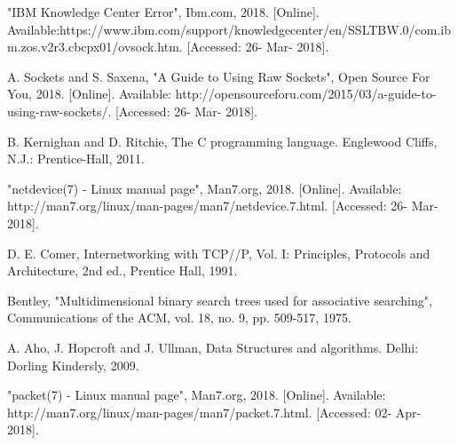  "IBM Knowledge Center Error", Ibm.com, 2018. [Online]. Available:https://www.ibm.com/support/knowledgecenter/en/SSLTBW.0/com.ibm.zos.v2r3.cbcpx01/ovsock.htm. [Accessed: 26- Mar- 2018].

 A. Sockets and S. Saxena, "A Guide to Using Raw Sockets", Open Source For You, 2018. [Online]. Available: http://opensourceforu.com/2015/03/a-guide-to-using-raw-sockets/. [Accessed: 26- Mar- 2018]. 

 B. Kernighan and D. Ritchie, The C programming language. Englewood Cliffs, N.J.: Prentice-Hall, 2011.

 "netdevice(7) - Linux manual page", Man7.org, 2018. [Online]. Available: http://man7.org/linux/man-pages/man7/netdevice.7.html. [Accessed: 26- Mar- 2018].

 D. E. Comer, Internetworking with TCP//P, Vol. I: Principles, Protocols and Architecture, 2nd ed., Prentice Hall, 1991. 

  Bentley, "Multidimensional binary search trees used for associative searching", Communications of the ACM, vol. 18, no. 9, pp. 509-517, 1975. 

 A. Aho, J. Hopcroft and J. Ullman, Data Structures and algorithms. Delhi: Dorling Kindersly, 2009. 

 "packet(7) - Linux manual page", Man7.org, 2018. [Online]. Available: http://man7.org/linux/man-pages/man7/packet.7.html. [Accessed: 02- Apr- 2018].


